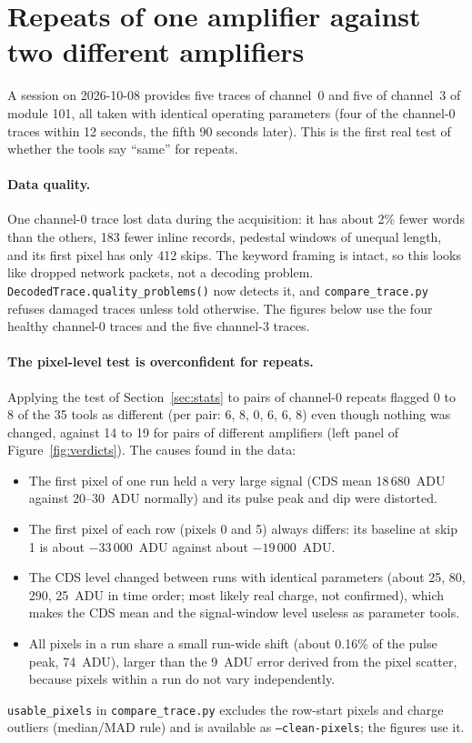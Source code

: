 \documentclass[11pt]{article}
\newcommand{\code}[1]{\texttt{#1}}
\begin{document}
\section{Repeats of one amplifier against two different amplifiers}
\label{sec:repeats}

A session on 2026-10-08 provides five traces of channel~0 and five of channel~3 of module 101, all taken with identical
operating parameters (four of the channel-0 traces within 12 seconds, the fifth 90 seconds later). This is the first real
test of whether the tools say ``same'' for repeats.

\paragraph{Data quality.} One channel-0 trace lost data during the acquisition: it has about 2\% fewer words than the others, 183 fewer
inline records, pedestal windows of unequal length, and its first pixel has only 412 skips. The keyword framing is intact, so
this looks like dropped network packets, not a decoding problem. \code{DecodedTrace.quality\_problems()} now detects it, and
\code{compare\_trace.py} refuses damaged traces unless told otherwise. The figures below use the four healthy channel-0
traces and the five channel-3 traces.

\paragraph{The pixel-level test is overconfident for repeats.} Applying the test of Section~\ref{sec:stats} to pairs of
channel-0 repeats flagged 0 to 8 of the 35 tools as different (per pair: 6, 8, 0, 6, 6, 8) even though nothing was changed, against 14 to 19 for
pairs of different amplifiers (left panel of Figure~\ref{fig:verdicts}). The causes found in the data:
\begin{itemize}
  \item The first pixel of one run held a very large signal (CDS mean 18\,680~ADU against 20--30~ADU normally) and its pulse peak and dip were distorted.
  \item The first pixel of each row (pixels 0 and 5) always differs: its baseline at skip 1 is about $-33\,000$~ADU against about $-19\,000$~ADU.
  \item The CDS level changed between runs with identical parameters (about 25, 80, 290, 25~ADU in time order; most likely real charge, not
        confirmed), which makes the CDS mean and the signal-window level useless as parameter tools.
  \item All pixels in a run share a small run-wide shift (about 0.16\% of the pulse peak, 74~ADU), larger than the 9~ADU error derived from
        the pixel scatter, because pixels within a run do not vary independently.
\end{itemize}
\code{usable\_pixels} in \code{compare\_trace.py} excludes the row-start pixels and charge outliers (median/MAD rule) and is available as
\code{--clean-pixels}; the figures use it.
\end{document}
